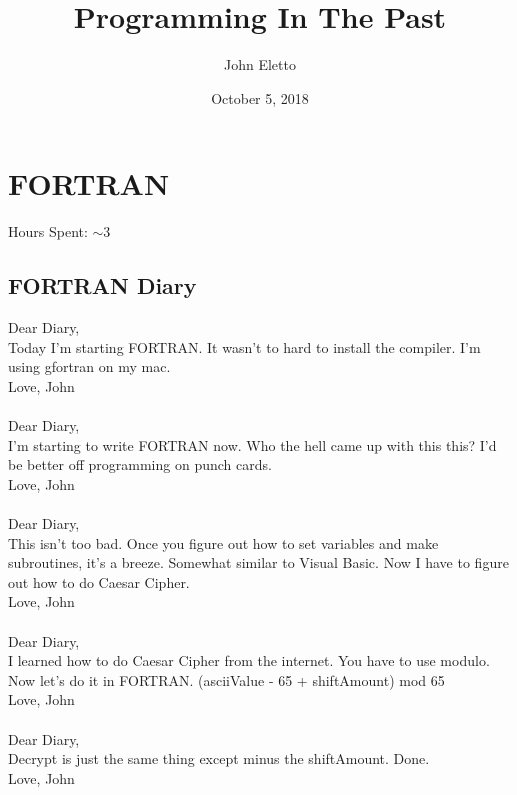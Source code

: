 \documentclass{report}
\title{Programming In The Past}
\author{John Eletto}
\date{October 5, 2018}
\begin{document}
\maketitle

\section*{FORTRAN}
Hours Spent: $\sim$3
\subsection*{FORTRAN Diary}
Dear Diary,
\\
Today I'm starting FORTRAN. It wasn't to hard to install the compiler. I'm using gfortran on my mac.
\\
Love, John
\\
\\
Dear Diary,
\\
I'm starting to write FORTRAN now. Who the hell came up with this this? I'd be better off programming on punch cards.
\\
Love, John
\\
\\
Dear Diary,
\\
This isn't too bad. Once you figure out how to set variables and make subroutines, it's a breeze. Somewhat similar to Visual Basic. Now I have to figure out how to do Caesar Cipher.
\\
Love, John
\\
\\
Dear Diary,
\\
I learned how to do Caesar Cipher from the internet. You have to use modulo. Now let's do it in FORTRAN. (asciiValue - 65 + shiftAmount) mod 65
\\
Love, John
\\
\\
Dear Diary,
\\
Decrypt is just the same thing except minus the shiftAmount. Done.
\\
Love, John
\end{document}
